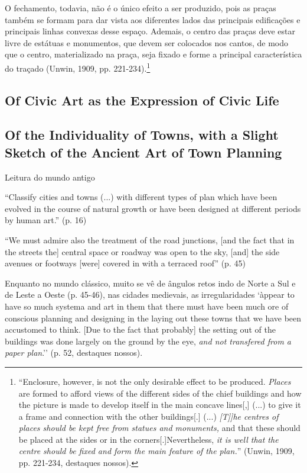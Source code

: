 \documentclass[12pt, a4paper]{book} %
\begin{document}
        O fechamento, todavia, não é o único efeito a ser produzido, pois as praças também se formam para dar vista aos diferentes lados das principais edificações e principais linhas convexas desse espaço. Ademais, o centro das praças deve estar livre de estátuas e monumentos, que devem ser colocados nos cantos, de modo que o centro, materializado na praça, seja fixado e forme a principal característica do traçado (Unwin, 1909, pp. 221-234).\footnote[78]{``Enclosure, however, is not the only desirable effect to be produced. \textit{Places} are formed to afford views of the different sides of the chief buildings and how the picture is made to develop itself in the main concave lines[,] (...) to give it a frame and connection with the other buildings[.] (...) \textit{[T]]he centres of places should be kept free from statues and monuments,} and that these should be placed at the sides or in the corners[.]Nevertheless, \textit{it is well that the centre should be fixed and form the main feature of the plan.}'' (Unwin, 1909, pp. 221-234, destaques nossos).}














        \subsection*{Of Civic Art as the Expression of Civic Life}
        \subsection*{Of the Individuality of Towns, with a Slight Sketch of the Ancient Art of Town Planning}

        Leitura do mundo antigo

        ``Classify cities and towns (...) with different types of plan which have been evolved in the course of natural growth or have been designed at different periods by human art.'' (p. 16)

        ``We must admire also the treatment of the road junctions, [and the fact that in the streets the] central space or roadway was open to the sky, [and] the side avenues or footways [were] covered in with a terraced roof'' (p. 45)

        Enquanto no mundo clássico, muito se vê de ângulos retos indo de Norte a Sul e de Leste a Oeste (p. 45-46), nas cidades medievais, as irregularidades `àppear to have so much systema and art in them that there must have been much ore of conscious planning and designing in the laying out these towns that we have been accustomed to think. [Due to the fact that probably] the setting out of the buildings was done largely on the ground by the eye, \textit{and not transfered from a paper plan}.'' (p. 52, destaques nossos).
\end{document}
